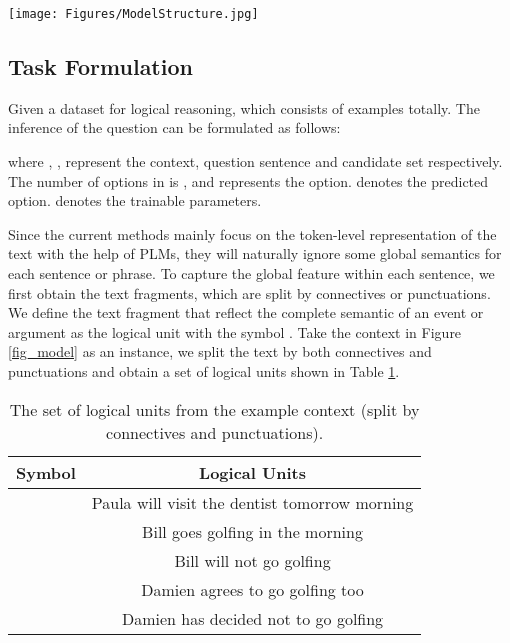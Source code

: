 \documentclass[sigconf]{acmart}
\begin{document}
\begin{figure*}[t]
	\large
	\centering
	\texttt{[image: Figures/ModelStructure.jpg]}
	\caption{The architecture of Logiformer. The left part is an input example of the dataset. The graph construction modules (\textit{a1,a2}) split the text into logical units and build two graphs from two branches respectively. The graph transformer structures (\textit{b1,b2}) update the text features combined with the logical and syntactic relations. Finally, the decoder module (\textit{c}) is utilized to conduct the feature fusion and predict the answers.}
	\label{fig_model}
	\vspace{-0.1cm}
\end{figure*}

\subsection{Task Formulation}
Given a dataset  for logical reasoning, which consists of  examples totally. The inference of the  question can be formulated as follows:

\vspace{-0.5cm}

where , ,  represent the context, question sentence and candidate set respectively. The number of options in  is ,  and  represents the  option.  denotes the predicted option.  denotes the trainable parameters.

Since the current methods mainly focus on the token-level representation of the text with the help of PLMs, they will naturally ignore some global semantics for each sentence or phrase. To capture the global feature within each sentence, we first obtain the text fragments, which are split by connectives or punctuations. We define the text fragment that reflect the complete semantic of an event or argument as the logical unit with the symbol . Take the context in Figure \ref{fig_model} as an instance, we split the text by both connectives and punctuations and obtain a set of logical units shown in Table \ref{logical_units}.

\begin{table}[t]
	\centering
	\caption{The set of logical units from the example context (split by connectives and punctuations).}
	\vspace{-0.25cm}
	\begin{tabular}{cc}
		\toprule
		\textbf{Symbol} & \textbf{Logical Units} \\
		\hline
		 & Paula will visit the dentist tomorrow morning\\
		 & Bill goes golfing in the morning\\
		 & Bill will not go golfing\\
		 & Damien agrees to go golfing too\\
		 & Damien has decided not to go golfing\\
		\bottomrule
	\end{tabular}
	\label{logical_units}
	\vspace{-0.4cm}
\end{table}
\end{document}
